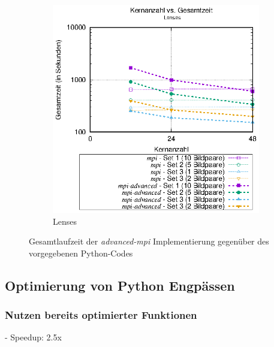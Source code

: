 \begin{center}
\begin{figure}[htbp]
\begin{subfigure}[b]{0.45\textwidth}
			\includegraphics[width=\textwidth]{pdf/mpi_advanced_times_lenses}
			\caption{Lenses}
			\label{fig:mpi_advanced_times_lenses}
		\end{subfigure}
		\caption{Gesamtlaufzeit der \textit{advanced-mpi} Implementierung gegenüber des vorgegebenen Python-Codes}
		\label{fig:mpi_advanced_times}
	\end{figure}
\end{center}

\subsection{Optimierung von Python Engpässen}

\subsubsection{Nutzen bereits optimierter Funktionen}

\begin{correctmore}
	- Speedup: 2.5x
\end{correctmore}


